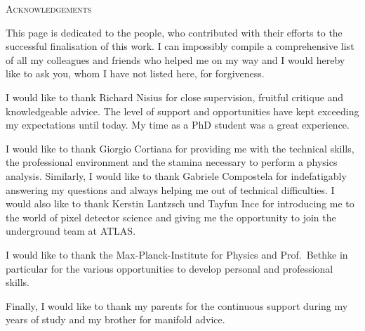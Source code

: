 \documentclass[a4paper,11pt,twoside,openright,notitlepage]{report}
\begin{document}







\cleardoublepage
{}
{}
\pagestyle{plain}

  {\vspace*{0.2cm}\begin{flushright}
	  \color{ChapterGray}\Huge \scshape Acknowledgements\\
	  \end{flushright}
  }
  \vspace{0.3cm}

  This page is dedicated to the people, who contributed with their efforts to the successful finalisation of this work. I can impossibly compile a comprehensive list of all my colleagues and friends who helped me on my way and I would hereby like to ask you, whom I have not listed here, for forgiveness.

  I would like to thank Richard Nisius for close supervision, fruitful critique and knowledgeable advice. The level of support and opportunities have kept exceeding my expectations until today. My time as a PhD student was a great experience.

  I would like to thank Giorgio Cortiana for providing me with the technical skills, the professional environment and the stamina necessary to perform a physics analysis.
%
  Similarly, I would like to thank Gabriele Compostela for indefatigably answering my questions and always helping me out of technical difficulties.
%
  I would also like to thank Kerstin Lantzsch und Tayfun Ince for introducing me to the world of pixel detector science and giving me the opportunity to join the underground team at \gls{ATLAS}.

  I would like to thank the Max-Planck-Institute for Physics and Prof.~Bethke in particular for the various opportunities to develop personal and professional skills.

  Finally, I would like to thank my parents for the continuous support during my years of study and my brother for manifold advice.

\end{document}
